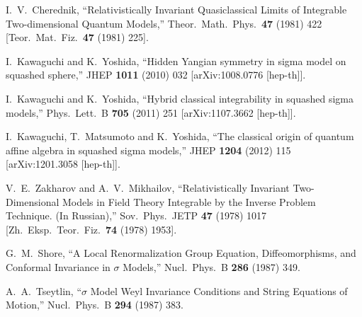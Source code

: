 \documentclass[12pt]{article}
\begin{document}
\begin{thebibliography}{99}
{  
  I.~V.~Cherednik,
  ``Relativistically Invariant Quasiclassical Limits of Integrable Two-dimensional Quantum Models,''
  Theor.\ Math.\ Phys.\  {\bf 47} (1981) 422
   [Teor.\ Mat.\ Fiz.\  {\bf 47} (1981) 225].
  
  I.~Kawaguchi and K.~Yoshida,
  ``Hidden Yangian symmetry in sigma model on squashed sphere,''
  JHEP {\bf 1011} (2010) 032
  [arXiv:1008.0776 [hep-th]].
  
  I.~Kawaguchi and K.~Yoshida,
  ``Hybrid classical integrability in squashed sigma models,''
  Phys.\ Lett.\ B {\bf 705} (2011) 251
  [arXiv:1107.3662 [hep-th]].
  
  I.~Kawaguchi, T.~Matsumoto and K.~Yoshida,
  ``The classical origin of quantum affine algebra in squashed sigma models,''
  JHEP {\bf 1204} (2012) 115
  [arXiv:1201.3058 [hep-th]].

  V.~E.~Zakharov and A.~V.~Mikhailov,
  ``Relativistically Invariant Two-Dimensional Models in Field Theory Integrable by the Inverse Problem Technique. (In Russian),''
  Sov.\ Phys.\ JETP {\bf 47} (1978) 1017
   [Zh.\ Eksp.\ Teor.\ Fiz.\  {\bf 74} (1978) 1953].
  

  G.~M.~Shore,
``A Local Renormalization Group Equation, Diffeomorphisms, and Conformal Invariance in $\sigma$ Models,''
  Nucl.\ Phys.\ B {\bf 286} (1987) 349.
  
  A.~A.~Tseytlin,
   ``$\sigma$ Model Weyl Invariance Conditions and String Equations of Motion,''
  Nucl.\ Phys.\ B {\bf 294} (1987) 383.
  
}
\end{thebibliography}
\end{document}
